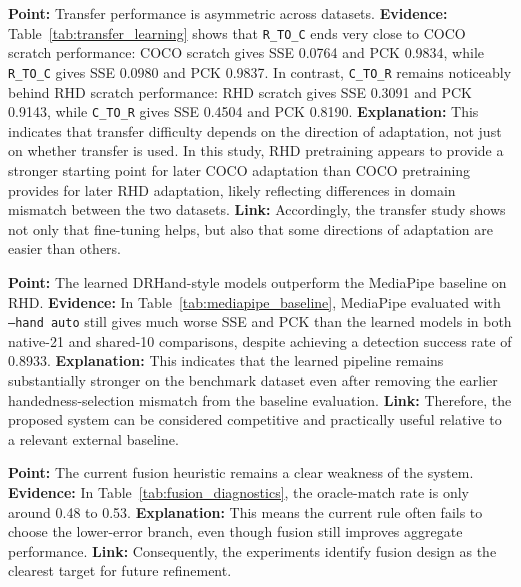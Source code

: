 \documentclass[10pt,letterpaper]{article}
\begin{document}
\medskip
\noindent\textbf{Point:} Transfer performance is asymmetric across datasets.
\textbf{Evidence:} Table~\ref{tab:transfer_learning} shows that \texttt{R\_TO\_C} ends very close to COCO scratch performance: COCO scratch gives SSE 0.0764 and PCK 0.9834, while \texttt{R\_TO\_C} gives SSE 0.0980 and PCK 0.9837. In contrast, \texttt{C\_TO\_R} remains noticeably behind RHD scratch performance: RHD scratch gives SSE 0.3091 and PCK 0.9143, while \texttt{C\_TO\_R} gives SSE 0.4504 and PCK 0.8190.
\textbf{Explanation:} This indicates that transfer difficulty depends on the direction of adaptation, not just on whether transfer is used. In this study, RHD pretraining appears to provide a stronger starting point for later COCO adaptation than COCO pretraining provides for later RHD adaptation, likely reflecting differences in domain mismatch between the two datasets.
\textbf{Link:} Accordingly, the transfer study shows not only that fine-tuning helps, but also that some directions of adaptation are easier than others.

\medskip
\noindent\textbf{Point:} The learned DRHand-style models outperform the MediaPipe baseline on RHD.
\textbf{Evidence:} In Table~\ref{tab:mediapipe_baseline}, MediaPipe evaluated with \texttt{--hand auto} still gives much worse SSE and PCK than the learned models in both native-21 and shared-10 comparisons, despite achieving a detection success rate of 0.8933.
\textbf{Explanation:} This indicates that the learned pipeline remains substantially stronger on the benchmark dataset even after removing the earlier handedness-selection mismatch from the baseline evaluation.
\textbf{Link:} Therefore, the proposed system can be considered competitive and practically useful relative to a relevant external baseline.

\medskip
\noindent\textbf{Point:} The current fusion heuristic remains a clear weakness of the system.
\textbf{Evidence:} In Table~\ref{tab:fusion_diagnostics}, the oracle-match rate is only around 0.48 to 0.53.
\textbf{Explanation:} This means the current rule often fails to choose the lower-error branch, even though fusion still improves aggregate performance.
\textbf{Link:} Consequently, the experiments identify fusion design as the clearest target for future refinement.
\end{document}
